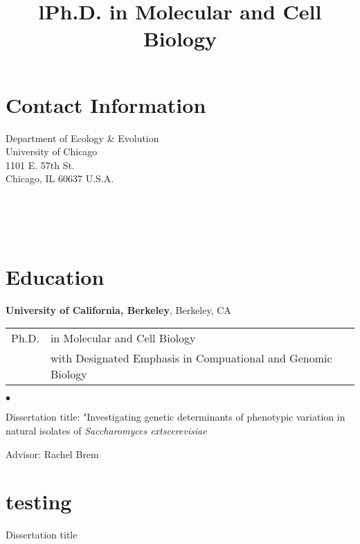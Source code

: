 \documentclass[margin,line]{res}
\newenvironment{bulletedlist}
	{\begin{list}{$\bullet$}{
		\setlength{\itemsep}{0in}
		\setlength{\parsep}{0in} \setlength{\parskip}{0in}
		\setlength{\topsep}{0in} \setlength{\partopsep}{0in}
		\setlength{\leftmargin}{0.2in}}
	}
	{\end{list}}
\begin{document}
\address{\sc
	hanalee@uchicago.edu $\cdot$ 510.485.9130 $\cdot$ http://hanalee.info
}

\begin{resume}

\section{\sc Contact Information}
Department of Ecology \& Evolution \\
University of Chicago \\
1101 E. 57th St. \\
Chicago, IL 60637 U.S.A.

\begin{format}
\title{l}\\
\\
\body\\
\end{format}

\section{\sc Education}
\vspace{0.05in}
{\bf University of California, Berkeley}, Berkeley, CA \\
\begin{tabular}{@{}p{0.5in}p{4.5in}}
Ph.D.	& in Molecular and Cell Biology \\
 		& with Designated Emphasis in Compuational and Genomic Biology
\end{tabular}
\begin{bulletedlist}
\item Dissertation title: "Investigating genetic determinants of phenotypic
variation in natural isolates of {\it Saccharomyces	extscerevisiae}
\item Advisor: Rachel Brem
\end{bulletedlist}

\section{\sc testing}
\title{Ph.D. in Molecular and Cell Biology}
\begin{position}
	Dissertation title
\end{position}

\end{resume}
\end{document}

